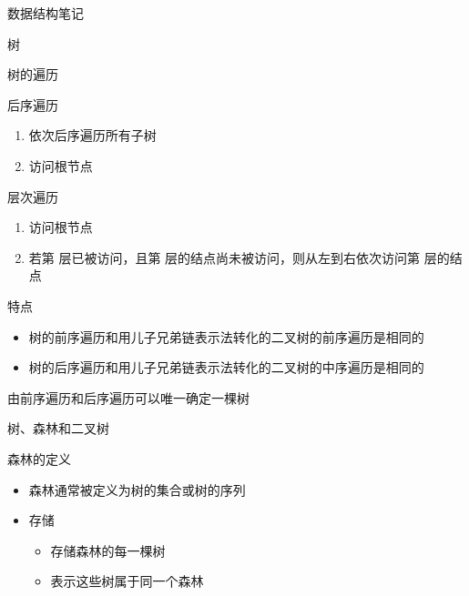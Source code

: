 \documentclass[
  ignorenonframetext,
]{beamer}
\providecommand{\tightlist}{%
  \setlength{\itemsep}{0pt}\setlength{\parskip}{0pt}}
\begin{document}
\begin{frame}[fragile]{数据结构笔记}
\begin{block}{树}
\begin{block}{树的遍历}
\begin{block}{后序遍历}
\protect{}\label{ux540eux5e8fux904dux5386-3}
\begin{enumerate}
\tightlist
\item
  依次后序遍历所有子树
\item
  访问根节点
\end{enumerate}
\end{block}

\begin{block}{层次遍历}
\protect{}\label{ux5c42ux6b21ux904dux5386-2}
\begin{enumerate}
\tightlist
\item
  访问根节点
\item
  若第 {} 层已被访问，且第 {} 层的结点尚未被访问，则从左到右依次访问第
  {} 层的结点
\end{enumerate}
\end{block}

\begin{block}{特点}
\protect{}\label{ux7279ux70b9}
\begin{itemize}
\tightlist
\item
  树的前序遍历和用儿子兄弟链表示法转化的二叉树的前序遍历是相同的
\item
  树的后序遍历和用儿子兄弟链表示法转化的二叉树的中序遍历是相同的
\end{itemize}

由前序遍历和后序遍历可以唯一确定一棵树
\end{block}
\end{block}

\begin{block}{树、森林和二叉树}
\protect{}\label{ux6811ux68eeux6797ux548cux4e8cux53c9ux6811}
\begin{block}{森林的定义}
\protect{}\label{ux68eeux6797ux7684ux5b9aux4e49}
\begin{itemize}
\tightlist
\item
  森林通常被定义为树的集合或树的序列
\item
  存储

  \begin{itemize}
  \tightlist
  \item
    存储森林的每一棵树
  \item
    表示这些树属于同一个森林
  \end{itemize}
\end{itemize}
\end{block}


\end{block}
\end{block}
\end{frame}
\end{document}

